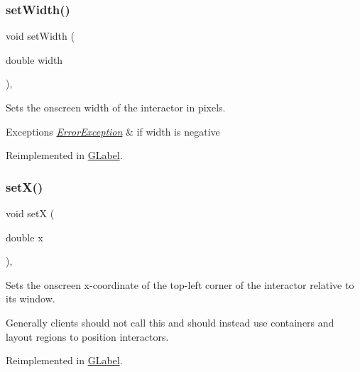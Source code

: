 \subsubsection{\texorpdfstring{set\+Width()}{setWidth()}}
{\footnotesize\ttfamily void set\+Width (\begin{DoxyParamCaption}\item[{double}]{width }\end{DoxyParamCaption})\hspace{0.3cm}{\ttfamily [virtual]}, {\ttfamily [inherited]}}



Sets the onscreen width of the interactor in pixels. 


\begin{DoxyExceptions}{Exceptions}
{\em \mbox{\hyperlink{classErrorException}{Error\+Exception}}} & if width is negative \\
\hline
\end{DoxyExceptions}


Reimplemented in \mbox{\hyperlink{classGLabel_aca9b9c666c4162ab0a27a10530bc0762}{G\+Label}}.

\mbox{\label{classGInteractor_a9c18fcc579333bf9653d13ad2b372e39}} 
\subsubsection{\texorpdfstring{set\+X()}{setX()}}
{\footnotesize\ttfamily void setX (\begin{DoxyParamCaption}\item[{double}]{x }\end{DoxyParamCaption})\hspace{0.3cm}{\ttfamily [virtual]}, {\ttfamily [inherited]}}



Sets the onscreen x-\/coordinate of the top-\/left corner of the interactor relative to its window. 

Generally clients should not call this and should instead use containers and layout regions to position interactors. 

Reimplemented in \mbox{\hyperlink{classGLabel_af7260dc32f150e3a5072e7e8eb2628b1}{G\+Label}}.

\mbox{\label{classGInteractor_a7d57e2a5c35d27feb58fd498a3cf82b9}} 
